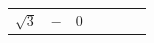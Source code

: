 {\begin{tabular}[t]{|l|l|l|l|l|l|l|}
                \begin{math}\sqrt{3}\end{math}
               &
                \begin{math}-\end{math}
               &
        0%
     \tabularnewline\cline{1-1}\cline{2-2}\cline{3-3}\cline{4-4}\cline{5-5}\cline{6-6}\cline{7-7}
    \end{tabular}} %
        \addtolength{\mytableboxheight}{\mytableboxdepth}
